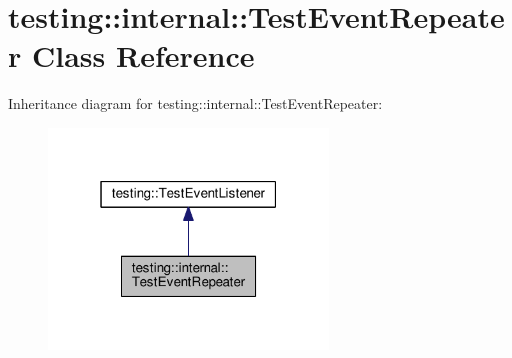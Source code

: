 \hypertarget{classtesting_1_1internal_1_1_test_event_repeater}{}\section{testing\+:\+:internal\+:\+:Test\+Event\+Repeater Class Reference}
\label{classtesting_1_1internal_1_1_test_event_repeater}


Inheritance diagram for testing\+:\+:internal\+:\+:Test\+Event\+Repeater\+:
\nopagebreak
\begin{figure}[H]
\begin{center}
\leavevmode
\includegraphics[width=211pt]{classtesting_1_1internal_1_1_test_event_repeater__inherit__graph}
\end{center}
\end{figure}
